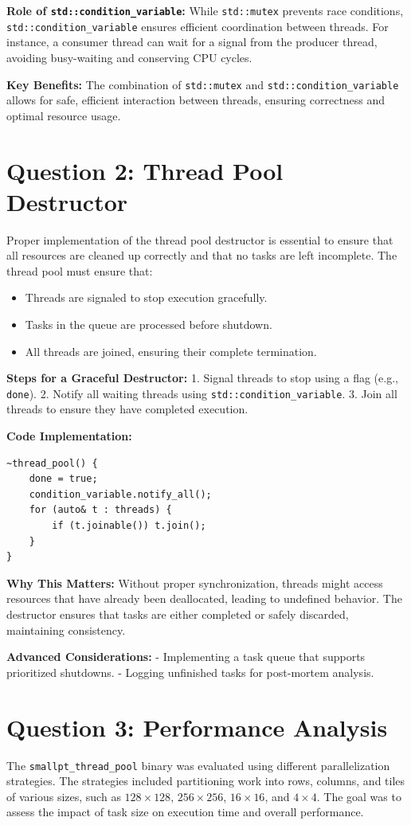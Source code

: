 \documentclass{article}
\begin{document}
\textbf{Role of \texttt{std::condition\_variable}:}  
While \texttt{std::mutex} prevents race conditions, \texttt{std::condition\_variable} ensures efficient coordination between threads. For instance, a consumer thread can wait for a signal from the producer thread, avoiding busy-waiting and conserving CPU cycles.

\textbf{Key Benefits:}  
The combination of \texttt{std::mutex} and \texttt{std::condition\_variable} allows for safe, efficient interaction between threads, ensuring correctness and optimal resource usage.

\section*{Question 2: Thread Pool Destructor}
Proper implementation of the thread pool destructor is essential to ensure that all resources are cleaned up correctly and that no tasks are left incomplete. The thread pool must ensure that:
\begin{itemize}
    \item Threads are signaled to stop execution gracefully.
    \item Tasks in the queue are processed before shutdown.
    \item All threads are joined, ensuring their complete termination.
\end{itemize}

\textbf{Steps for a Graceful Destructor:}  
1. Signal threads to stop using a flag (e.g., \texttt{done}).  
2. Notify all waiting threads using \texttt{std::condition\_variable}.  
3. Join all threads to ensure they have completed execution.

\textbf{Code Implementation:}  
\begin{verbatim}
~thread_pool() {
    done = true;
    condition_variable.notify_all();
    for (auto& t : threads) {
        if (t.joinable()) t.join();
    }
}
\end{verbatim}

\textbf{Why This Matters:}  
Without proper synchronization, threads might access resources that have already been deallocated, leading to undefined behavior. The destructor ensures that tasks are either completed or safely discarded, maintaining consistency.

\textbf{Advanced Considerations:}  
- Implementing a task queue that supports prioritized shutdowns.  
- Logging unfinished tasks for post-mortem analysis.

\section*{Question 3: Performance Analysis}
The \texttt{smallpt\_thread\_pool} binary was evaluated using different parallelization strategies. The strategies included partitioning work into rows, columns, and tiles of various sizes, such as \(128 \times 128\), \(256 \times 256\), \(16 \times 16\), and \(4 \times 4\). The goal was to assess the impact of task size on execution time and overall performance.
\end{document}
